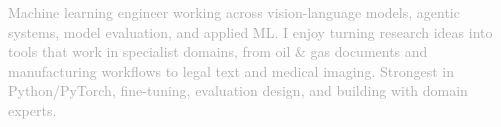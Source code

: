 

\textcolor{darkgray}{Machine learning engineer working across vision-language models, agentic systems, model evaluation, and applied ML. I enjoy turning research ideas into tools that work in specialist domains, from oil \& gas documents and manufacturing workflows to legal text and medical imaging. Strongest in Python/PyTorch, fine-tuning, evaluation design, and building with domain experts.}
